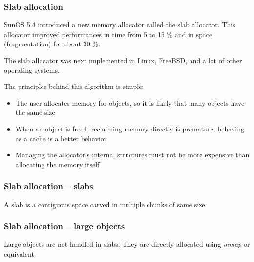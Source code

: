 \begin{frame}
  \frametitle{Slab allocation}

  SunOS 5.4 introduced a new memory allocator called the slab
  allocator. This allocator improved performances in time from 5 to 15
  \% and in space (fragmentation) for about 30 \%.

  \-

  The slab allocator was next implemented in Linux, FreeBSD, and a lot
  of other operating systems.

  \-

  The principles behind this algorithm is simple:

  \begin{itemize}
  \item
    The user allocates memory for objects, so it is likely that many
    objects have the same size
  \item
    When an object is freed, reclaiming memory directly is premature,
    behaving as a cache is a better behavior
  \item
    Managing the allocator's internal structures must not be more
    expensive than allocating the memory itself
  \end{itemize}

\end{frame}

\begin{frame}
  \frametitle{Slab allocation -- slabs}

  A slab is a contiguous space carved in multiple chunks of same size.

  \begin{center}
  \end{center}

\end{frame}

\begin{frame}
  \frametitle{Slab allocation -- large objects}

  Large objects are not handled in slabs. They are directly allocated
  using \emph{mmap} or equivalent.

\end{frame}

